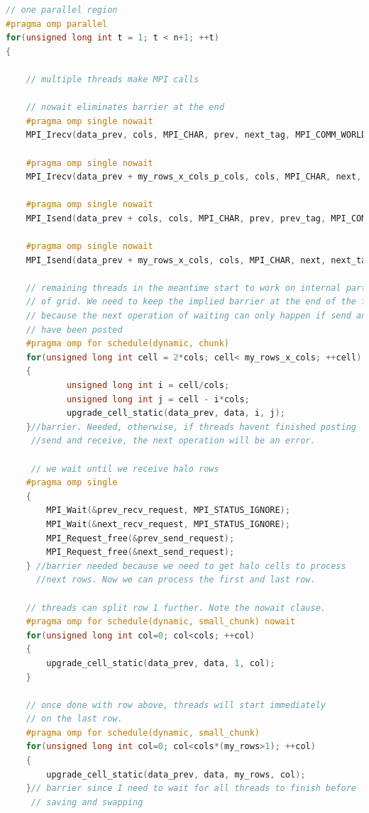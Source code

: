 \documentclass{report}
\begin{document}
\begin{lstlisting}[language=C++]
// one parallel region
#pragma omp parallel
for(unsigned long int t = 1; t < n+1; ++t)
{

    // multiple threads make MPI calls

    // nowait eliminates barrier at the end
    #pragma omp single nowait
    MPI_Irecv(data_prev, cols, MPI_CHAR, prev, next_tag, MPI_COMM_WORLD, &prev_recv_request);

    #pragma omp single nowait
    MPI_Irecv(data_prev + my_rows_x_cols_p_cols, cols, MPI_CHAR, next, prev_tag, MPI_COMM_WORLD, &next_recv_request);

    #pragma omp single nowait
    MPI_Isend(data_prev + cols, cols, MPI_CHAR, prev, prev_tag, MPI_COMM_WORLD, &prev_send_request);

    #pragma omp single nowait
    MPI_Isend(data_prev + my_rows_x_cols, cols, MPI_CHAR, next, next_tag, MPI_COMM_WORLD, &next_send_request);

    // remaining threads in the meantime start to work on internal part 
    // of grid. We need to keep the implied barrier at the end of the for loop 
    // because the next operation of waiting can only happen if send and recv 
    // have been posted
    #pragma omp for schedule(dynamic, chunk)
    for(unsigned long int cell = 2*cols; cell< my_rows_x_cols; ++cell)
    {
            unsigned long int i = cell/cols;
            unsigned long int j = cell - i*cols;
            upgrade_cell_static(data_prev, data, i, j);
    }//barrier. Needed, otherwise, if threads havent finished posting 
     //send and receive, the next operation will be an error.

     // we wait until we receive halo rows
    #pragma omp single
    {
        MPI_Wait(&prev_recv_request, MPI_STATUS_IGNORE);
        MPI_Wait(&next_recv_request, MPI_STATUS_IGNORE);
        MPI_Request_free(&prev_send_request);
        MPI_Request_free(&next_send_request);
    } //barrier needed because we need to get halo cells to process 
      //next rows. Now we can process the first and last row.

    // threads can split row 1 further. Note the nowait clause.
    #pragma omp for schedule(dynamic, small_chunk) nowait
    for(unsigned long int col=0; col<cols; ++col)
    {
        upgrade_cell_static(data_prev, data, 1, col);
    }

    // once done with row above, threads will start immediately 
    // on the last row.
    #pragma omp for schedule(dynamic, small_chunk)
    for(unsigned long int col=0; col<cols*(my_rows>1); ++col)
    {
        upgrade_cell_static(data_prev, data, my_rows, col);
    }// barrier since I need to wait for all threads to finish before 
     // saving and swapping


\end{lstlisting}
\end{document}
